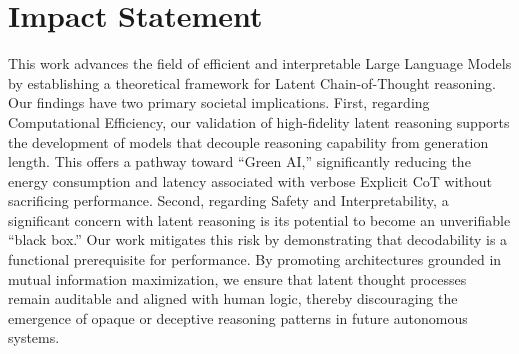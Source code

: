 \documentclass{article}
\theoremstyle{plain}
\theoremstyle{definition}
\theoremstyle{remark}
\begin{document}
\section*{Impact Statement}

This work advances the field of efficient and interpretable Large Language Models by establishing a theoretical framework for Latent Chain-of-Thought reasoning. 
Our findings have two primary societal implications.
First, regarding Computational Efficiency, our validation of high-fidelity latent reasoning supports the development of models that decouple reasoning capability from generation length. This offers a pathway toward ``Green AI,'' significantly reducing the energy consumption and latency associated with verbose Explicit CoT without sacrificing performance.
Second, regarding Safety and Interpretability, a significant concern with latent reasoning is its potential to become an unverifiable ``black box.'' Our work mitigates this risk by demonstrating that decodability is a functional prerequisite for performance. By promoting architectures grounded in mutual information maximization, we ensure that latent thought processes remain auditable and aligned with human logic, thereby discouraging the emergence of opaque or deceptive reasoning patterns in future autonomous systems.






\newpage
\appendix
\onecolumn

% 




\end{document}
